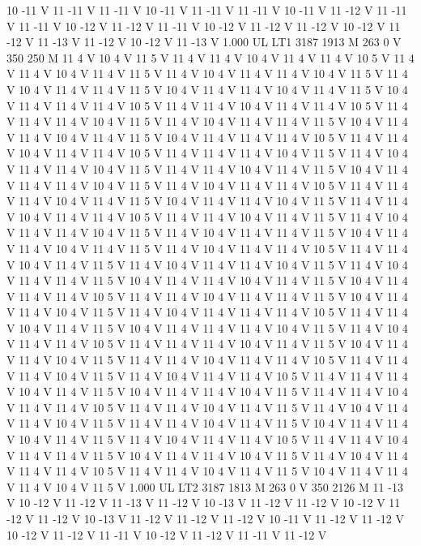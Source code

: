 {10 -11 V
11 -11 V
11 -11 V
10 -11 V
11 -11 V
11 -11 V
10 -11 V
11 -12 V
11 -11 V
11 -11 V
10 -12 V
11 -12 V
11 -11 V
10 -12 V
11 -12 V
11 -12 V
10 -12 V
11 -12 V
11 -13 V
11 -12 V
10 -12 V
11 -13 V
1.000 UL
LT1
3187 1913 M
263 0 V
350 250 M
11 4 V
10 4 V
11 5 V
11 4 V
11 4 V
10 4 V
11 4 V
11 4 V
10 5 V
11 4 V
11 4 V
10 4 V
11 4 V
11 5 V
11 4 V
10 4 V
11 4 V
11 4 V
10 4 V
11 5 V
11 4 V
10 4 V
11 4 V
11 4 V
11 5 V
10 4 V
11 4 V
11 4 V
10 4 V
11 4 V
11 5 V
10 4 V
11 4 V
11 4 V
11 4 V
10 5 V
11 4 V
11 4 V
10 4 V
11 4 V
11 4 V
10 5 V
11 4 V
11 4 V
11 4 V
10 4 V
11 5 V
11 4 V
10 4 V
11 4 V
11 4 V
11 5 V
10 4 V
11 4 V
11 4 V
10 4 V
11 4 V
11 5 V
10 4 V
11 4 V
11 4 V
11 4 V
10 5 V
11 4 V
11 4 V
10 4 V
11 4 V
11 4 V
10 5 V
11 4 V
11 4 V
11 4 V
10 4 V
11 5 V
11 4 V
10 4 V
11 4 V
11 4 V
10 4 V
11 5 V
11 4 V
11 4 V
10 4 V
11 4 V
11 5 V
10 4 V
11 4 V
11 4 V
11 4 V
10 4 V
11 5 V
11 4 V
10 4 V
11 4 V
11 4 V
10 5 V
11 4 V
11 4 V
11 4 V
10 4 V
11 4 V
11 5 V
10 4 V
11 4 V
11 4 V
10 4 V
11 5 V
11 4 V
11 4 V
10 4 V
11 4 V
11 4 V
10 5 V
11 4 V
11 4 V
10 4 V
11 4 V
11 5 V
11 4 V
10 4 V
11 4 V
11 4 V
10 4 V
11 5 V
11 4 V
10 4 V
11 4 V
11 4 V
11 5 V
10 4 V
11 4 V
11 4 V
10 4 V
11 4 V
11 5 V
11 4 V
10 4 V
11 4 V
11 4 V
10 5 V
11 4 V
11 4 V
10 4 V
11 4 V
11 5 V
11 4 V
10 4 V
11 4 V
11 4 V
10 4 V
11 5 V
11 4 V
10 4 V
11 4 V
11 4 V
11 5 V
10 4 V
11 4 V
11 4 V
10 4 V
11 4 V
11 5 V
10 4 V
11 4 V
11 4 V
11 4 V
10 5 V
11 4 V
11 4 V
10 4 V
11 4 V
11 4 V
11 5 V
10 4 V
11 4 V
11 4 V
10 4 V
11 5 V
11 4 V
10 4 V
11 4 V
11 4 V
11 4 V
10 5 V
11 4 V
11 4 V
10 4 V
11 4 V
11 5 V
10 4 V
11 4 V
11 4 V
11 4 V
10 4 V
11 5 V
11 4 V
10 4 V
11 4 V
11 4 V
10 5 V
11 4 V
11 4 V
11 4 V
10 4 V
11 4 V
11 5 V
10 4 V
11 4 V
11 4 V
10 4 V
11 5 V
11 4 V
11 4 V
10 4 V
11 4 V
11 4 V
10 5 V
11 4 V
11 4 V
11 4 V
10 4 V
11 5 V
11 4 V
10 4 V
11 4 V
11 4 V
10 5 V
11 4 V
11 4 V
11 4 V
10 4 V
11 4 V
11 5 V
10 4 V
11 4 V
11 4 V
10 4 V
11 5 V
11 4 V
11 4 V
10 4 V
11 4 V
11 4 V
10 5 V
11 4 V
11 4 V
10 4 V
11 4 V
11 5 V
11 4 V
10 4 V
11 4 V
11 4 V
10 4 V
11 5 V
11 4 V
11 4 V
10 4 V
11 4 V
11 5 V
10 4 V
11 4 V
11 4 V
10 4 V
11 4 V
11 5 V
11 4 V
10 4 V
11 4 V
11 4 V
10 5 V
11 4 V
11 4 V
10 4 V
11 4 V
11 4 V
11 5 V
10 4 V
11 4 V
11 4 V
10 4 V
11 5 V
11 4 V
10 4 V
11 4 V
11 4 V
11 4 V
10 5 V
11 4 V
11 4 V
10 4 V
11 4 V
11 5 V
10 4 V
11 4 V
11 4 V
11 4 V
10 4 V
11 5 V
1.000 UL
LT2
3187 1813 M
263 0 V
350 2126 M
11 -13 V
10 -12 V
11 -12 V
11 -13 V
11 -12 V
10 -13 V
11 -12 V
11 -12 V
10 -12 V
11 -12 V
11 -12 V
10 -13 V
11 -12 V
11 -12 V
11 -12 V
10 -11 V
11 -12 V
11 -12 V
10 -12 V
11 -12 V
11 -11 V
10 -12 V
11 -12 V
11 -11 V
11 -12 V
}
